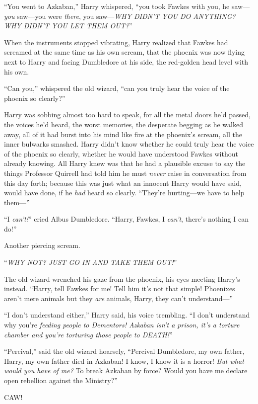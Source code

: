 “You went to Azkaban,” Harry whispered, “you took Fawkes with you, he
saw—\emph{you} saw—you were \emph{there}, you saw—\emph{WHY DIDN’T YOU DO
ANYTHING? WHY DIDN’T YOU LET THEM OUT?}”

When the instruments stopped vibrating, Harry realized that Fawkes had screamed
at the same time as his own scream, that the phoenix was now flying next to
Harry and facing Dumbledore at his side, the red-golden head level with his own.

“Can you,” whispered the old wizard, “can you truly hear the voice of the
phoenix so clearly?”

Harry was sobbing almost too hard to speak, for all the metal doors he’d
passed, the voices he’d heard, the worst memories, the desperate begging as he
walked away, all of it had burst into his mind like fire at the phoenix’s
scream, all the inner bulwarks smashed. Harry didn’t know whether he could
truly hear the voice of the phoenix so clearly, whether he would have
understood Fawkes without already knowing. All Harry knew was that he had a
plausible excuse to say the things Professor Quirrell had told him he must
\emph{never} raise in conversation from this day forth; because this was just
what an innocent Harry would have said, would have done, if he \emph{had} heard
so clearly. “They’re hurting—we have to help them—”

“I \emph{can’t!}” cried Albus Dumbledore. “Harry, Fawkes, I \emph{can’t},
there’s nothing I can do!”

Another piercing scream.

“\emph{WHY NOT? JUST GO IN AND TAKE THEM OUT!}”

The old wizard wrenched his gaze from the phoenix, his eyes meeting Harry’s
instead. “Harry, tell Fawkes for me! Tell him it’s not that simple! Phoenixes
aren’t mere animals but they \emph{are} animals, Harry, they can’t
understand—”

“I don’t understand either,” Harry said, his voice trembling. “I don’t
understand why you’re \emph{feeding people to Dementors! Azkaban isn’t a
prison, it’s a torture chamber and you’re torturing those people to DEATH!}”

“Percival,” said the old wizard hoarsely, “Percival Dumbledore, my own father,
Harry, my own father died in Azkaban! I know, I know it is a horror! \emph{But
what would you have of me?} To break Azkaban by force? Would you have me
declare open rebellion against the Ministry?”

CAW!

